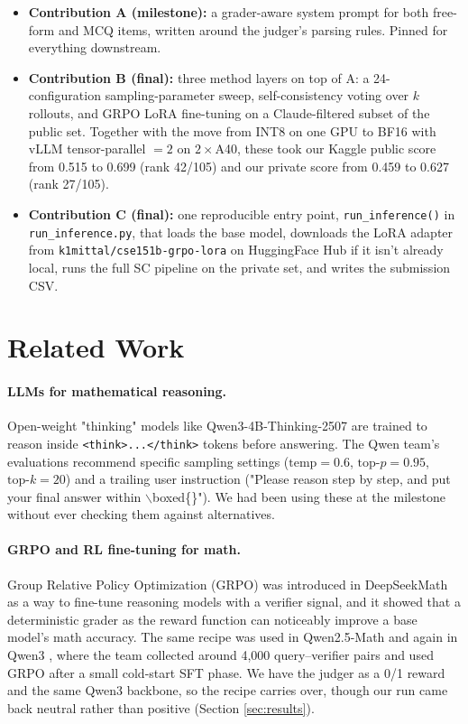 \documentclass{article}
\begin{document}
\begin{itemize}
  \item \textbf{Contribution A (milestone):} a grader-aware system
  prompt for both free-form and MCQ items, written around the
  judger's parsing rules. Pinned for everything downstream.
  \item \textbf{Contribution B (final):} three method layers on top
  of A: a 24-configuration sampling-parameter sweep,
  self-consistency voting over $k$ rollouts, and GRPO
  \citep{shao2024deepseekmath} LoRA fine-tuning on a
  Claude-filtered subset of the public set. Together with the move
  from INT8 on one GPU to BF16 with vLLM tensor-parallel $=2$ on
  $2\times$A40, these took our Kaggle public score from 0.515 to
  0.699 (rank 42/105) and our private score from 0.459 to 0.627
  (rank 27/105).
  \item \textbf{Contribution C (final):} one reproducible entry
  point, \texttt{run\_inference()} in \texttt{run\_inference.py},
  that loads the base model, downloads the LoRA adapter from
  \texttt{k1mittal/cse151b-grpo-lora} on HuggingFace Hub if it
  isn't already local, runs the full SC pipeline on the
  private set, and writes the submission CSV.
\end{itemize}


\section{Related Work}
\label{sec:relatedwork}

\paragraph{LLMs for mathematical reasoning.}
Open-weight "thinking" models like Qwen3-4B-Thinking-2507
\citep{qwen3technicalreport} are trained to reason inside
\texttt{<think>...</think>} tokens before answering. The Qwen
team's evaluations recommend specific sampling settings
($\text{temp}=0.6$, $\text{top-}p=0.95$, $\text{top-}k=20$) and
a trailing user instruction ("Please reason step by step, and put
your final answer within $\backslash$boxed\{\}"). We had been
using these at the milestone without ever checking them against
alternatives.

\paragraph{GRPO and RL fine-tuning for math.}
Group Relative Policy Optimization (GRPO) was introduced in
DeepSeekMath \citep{shao2024deepseekmath} as a way to fine-tune
reasoning models with a verifier signal, and it showed that a
deterministic grader as the reward function can noticeably
improve a base model's math accuracy. The same recipe was used in
Qwen2.5-Math \citep{qwen25math} and again in Qwen3
\citep{qwen3technicalreport}, where the team collected around
4{,}000 query--verifier pairs and used GRPO after a small
cold-start SFT phase. We have the judger as a 0/1 reward and the
same Qwen3 backbone, so the recipe carries over, though our run
came back neutral rather than positive (Section
\ref{sec:results}).
\end{document}
